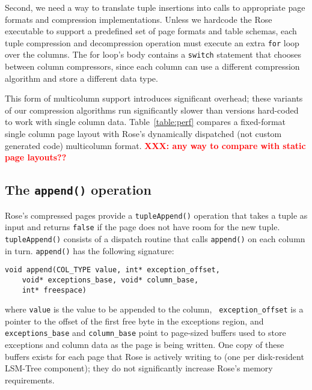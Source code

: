 \documentclass{vldb}
\newcommand{\rows}{Rose\xspace}
\newcommand{\rowss}{Rose's\xspace}
\newcommand{\xxx}[1]{\textcolor{red}{\bf XXX: #1}}
\begin{document}
Second, we need a way to translate tuple insertions into
calls to appropriate page formats and compression implementations.
Unless we hardcode the \rows executable to support a predefined set of
page formats and table schemas, each tuple compression and decompression operation must execute an extra {\tt for} loop
over the columns.  The for loop's body contains a {\tt switch} statement that chooses between column compressors, since each column can use a different compression algorithm and store a different data type.

This form of multicolumn support introduces significant overhead;
these variants of our compression algorithms run significantly slower
than versions hard-coded to work with single column data.
Table~\ref{table:perf} compares a fixed-format single column page
layout with \rowss dynamically dispatched (not custom generated code)
multicolumn format. \xxx{any way to compare with static page layouts??}


\subsection{The {\tt \large append()} operation}

\rowss compressed pages provide a {\tt tupleAppend()} operation that
takes a tuple as input and returns {\tt false} if the page does not have
room for the new tuple.  {\tt tupleAppend()} consists of a dispatch
routine that calls {\tt append()} on each column in turn.
{\tt append()} has the
following signature:
\begin{verbatim}
void append(COL_TYPE value, int* exception_offset,
    void* exceptions_base, void* column_base,
    int* freespace)
\end{verbatim}
where {\tt value} is the value to be appended to the column, {\tt
  exception\_offset} is a pointer to the offset of the first free byte in the
exceptions region, and {\tt exceptions\_base} and {\tt column\_base} point
to page-sized buffers used to store exceptions and column data as
the page is being written.  One copy of these buffers exists for
each page that \rows is actively writing to (one per disk-resident
LSM-Tree component); they do not significantly increase \rowss memory
requirements.
\end{document}
